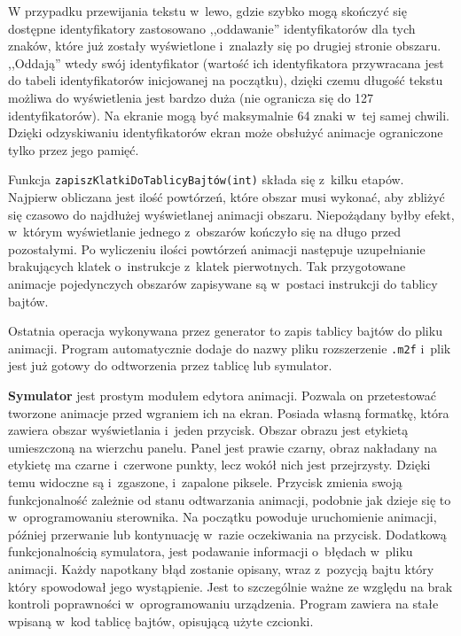 W przypadku przewijania tekstu w~lewo, gdzie szybko mogą skończyć się dostępne identyfikatory zastosowano ,,oddawanie'' identyfikatorów dla tych znaków, które już zostały wyświetlone i~znalazły się po drugiej stronie obszaru. ,,Oddają'' wtedy swój identyfikator (wartość ich identyfikatora przywracana jest do tabeli identyfikatorów inicjowanej na początku), dzięki czemu długość tekstu możliwa do wyświetlenia jest bardzo duża (nie ogranicza się do 127 identyfikatorów). Na ekranie mogą być maksymalnie 64 znaki w~tej samej chwili. Dzięki odzyskiwaniu identyfikatorów ekran może obsłużyć animacje ograniczone tylko przez jego pamięć.

Funkcja \texttt{zapiszKlatkiDoTablicyBajtów(int)} składa się z~kilku etapów. Najpierw obliczana jest ilość powtórzeń, które obszar musi wykonać, aby zbliżyć się czasowo do najdłużej wyświetlanej animacji obszaru. Niepożądany byłby efekt, w~którym wyświetlanie jednego z~obszarów kończyło się na długo przed pozostałymi. Po wyliczeniu ilości powtórzeń animacji następuje uzupełnianie brakujących klatek o~instrukcje z~klatek pierwotnych. Tak przygotowane animacje pojedynczych obszarów zapisywane są w~postaci instrukcji do tablicy bajtów.

Ostatnia operacja wykonywana przez generator to zapis tablicy bajtów do pliku animacji. Program automatycznie dodaje do nazwy pliku rozszerzenie \texttt{.m2f} i~plik jest już gotowy do odtworzenia przez tablicę lub symulator.


\textbf{Symulator} jest prostym modułem edytora animacji. Pozwala on przetestować tworzone animacje przed wgraniem ich na ekran. Posiada własną formatkę, która zawiera obszar wyświetlania i~jeden przycisk. Obszar obrazu jest etykietą umieszczoną na wierzchu panelu. Panel jest prawie czarny, obraz nakładany na etykietę ma czarne i~czerwone punkty, lecz wokół nich jest przejrzysty. Dzięki temu widoczne są i~zgaszone, i~zapalone piksele. Przycisk zmienia swoją funkcjonalność zależnie od stanu odtwarzania animacji, podobnie jak dzieje się to w~oprogramowaniu sterownika. Na początku powoduje uruchomienie animacji, później przerwanie lub kontynuację w~razie oczekiwania na przycisk. Dodatkową funkcjonalnością symulatora, jest podawanie informacji o~błędach w~pliku animacji. Każdy napotkany błąd zostanie opisany, wraz z~pozycją bajtu który który spowodował jego wystąpienie. Jest to szczególnie ważne ze względu na brak kontroli poprawności w~oprogramowaniu urządzenia. Program zawiera na stałe wpisaną w~kod tablicę bajtów, opisującą użyte czcionki.

